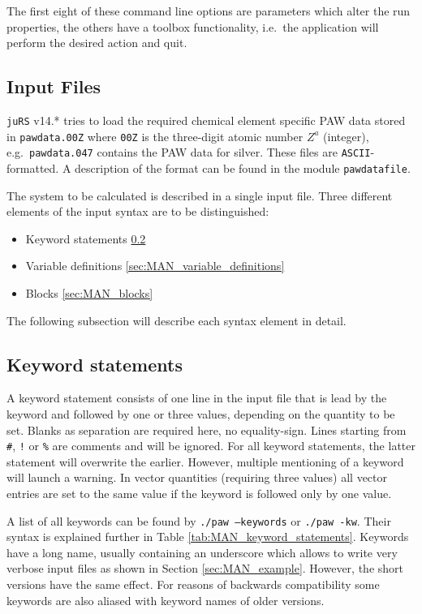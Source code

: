 \documentclass[12pt,BCOR8mm,noappendixprefix,nochapterprefix,bibtotoc,idxtotoc,openbib,tablecaptionabove]{scrbook}
\newcommand{\juRS}{\texttt{juRS}} %
\newcommand{\ttt}[1]{\texttt{#1}}
\begin{document}
The first eight of these command line options are parameters which alter the 
run properties, the others have a toolbox functionality, i.e.~the application 
will perform the desired action and quit.

\subsection{Input Files} \label{sec:MAN_input_files}

\juRS{} v14.* tries to load the required chemical element specific PAW data stored 
in \ttt{pawdata.00Z} where \ttt{00Z} is the three-digit atomic number $Z^a$ (integer), 
e.g.~\ttt{pawdata.047} contains the PAW data for silver. These files are 
\ttt{ASCII}-formatted. 
A description of the format can be found in the module \ttt{pawdatafile}.

The system to be calculated is described in a single input file. 
Three different elements of the input syntax are to be distinguished:
\begin{itemize}
 \item Keyword statements \ref{sec:MAN_keyword_statements}
 \item Variable definitions \ref{sec:MAN_variable_definitions}
 \item Blocks \ref{sec:MAN_blocks}
\end{itemize}
The following subsection will describe each syntax element in detail.

\subsection{Keyword statements} \label{sec:MAN_keyword_statements}

A keyword statement consists of one line in the input file that is 
lead by the keyword and followed by one or three values, depending on the 
quantity to be set. Blanks as separation are required here, no equality-sign. 
Lines starting from \ttt{\#}, \ttt{!} or \ttt{\%} are comments and will be ignored. 
For all keyword statements, the latter statement will overwrite the earlier. 
However, multiple mentioning of a keyword will launch a warning. 
In vector quantities (requiring three values) all vector entries are set to 
the same value if the keyword is followed only by one value.

A list of all keywords can be found by \ttt{./paw --keywords} or \ttt{./paw -kw}.
Their syntax is explained further in Table \ref{tab:MAN_keyword_statements}.
Keywords have a long name, usually containing an underscore which allows
to write very verbose input files as shown in Section \ref{sec:MAN_example}. However,
the short versions have the same effect. For reasons of backwards compatibility
some keywords are also aliased with keyword names of older versions.
\end{document}
